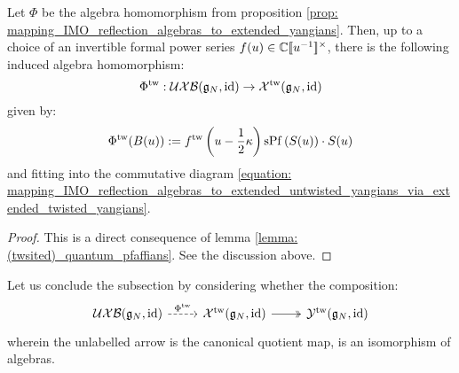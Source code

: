             \begin{proposition} \label{prop: mapping_IMO_reflection_algebras_to_extended_untwisted_yangians_via_extended_twisted_yangians}
                Let $\Phi$ be the algebra homomorphism from proposition \ref{prop: mapping_IMO_reflection_algebras_to_extended_yangians}. Then, up to a choice of an invertible formal power series $f(u) \in \bbC[\![u^{-1}]\!]^{\x}$, there is the following induced algebra homomorphism:
                    $$\Phi^{\mathrm{tw}}: \mathcal{UXB}(\mathfrak{g}_N, \mathrm{id}) \to \mathcal{X}^{\mathrm{tw}}(\mathfrak{g}_N, \mathrm{id})$$
                given by:
                    $$\Phi^{\mathrm{tw}}( B(u) ) := f^{\mathrm{tw}}\left( u - \frac12 \kappa \right) \operatorname{sPf}\left( S(u) \right) \cdot S(u)$$
                and fitting into the commutative diagram \eqref{equation: mapping_IMO_reflection_algebras_to_extended_untwisted_yangians_via_extended_twisted_yangians}.
            \end{proposition}
                \begin{proof}
                    This is a direct consequence of lemma \ref{lemma: (twsited)_quantum_pfaffians}. See the discussion above.
                \end{proof}

            Let us conclude the subsection by considering whether the composition:
                \begin{equation} \label{equation: mapping_IMO_reflection_algebras_to_BCD0_twisted_yangians}
                    \begin{tikzcd}
                        {\UXB(\g_N, \id)} & {\calX^{\tw}(\g_N, \id)} & {\calY^{\tw}(\g_N, \id)}
                        \arrow["{\Phi^{\tw}}", dashed, from=1-1, to=1-2]
                        \arrow[two heads, from=1-2, to=1-3]
                    \end{tikzcd}
                \end{equation}
            wherein the unlabelled arrow is the canonical quotient map, is an isomorphism of algebras. 

